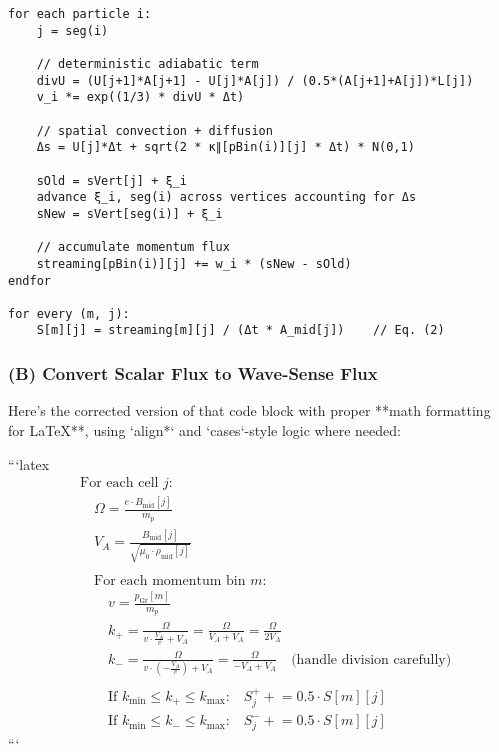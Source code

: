 \begin{lstlisting}
for each particle i:
    j = seg(i)

    // deterministic adiabatic term
    divU = (U[j+1]*A[j+1] - U[j]*A[j]) / (0.5*(A[j+1]+A[j])*L[j])
    v_i *= exp((1/3) * divU * Δt)

    // spatial convection + diffusion
    Δs = U[j]*Δt + sqrt(2 * κ∥[pBin(i)][j] * Δt) * N(0,1)

    sOld = sVert[j] + ξ_i
    advance ξ_i, seg(i) across vertices accounting for Δs
    sNew = sVert[seg(i)] + ξ_i

    // accumulate momentum flux
    streaming[pBin(i)][j] += w_i * (sNew - sOld)
endfor

for every (m, j):
    S[m][j] = streaming[m][j] / (Δt * A_mid[j])    // Eq. (2)
\end{lstlisting}

\subsubsection*{(B) Convert Scalar Flux to Wave-Sense Flux}

Here's the corrected version of that code block with proper **math formatting for LaTeX**, using `align*` and `cases`-style logic where needed:

```latex
\[
\begin{aligned}
&\text{For each cell } j: \\
&\quad \Omega = \frac{e \cdot B_{\text{mid}}[j]}{m_p} \\
&\quad V_A = \frac{B_{\text{mid}}[j]}{\sqrt{\mu_0 \cdot \rho_{\text{mid}}[j]}} \\
\\
&\quad \text{For each momentum bin } m: \\
&\quad \quad v = \frac{p_{\text{Gr}}[m]}{m_p} \\
&\quad \quad k_+ = \frac{\Omega}{v \cdot \frac{V_A}{v} + V_A} = \frac{\Omega}{V_A + V_A} = \frac{\Omega}{2V_A} \\
&\quad \quad k_- = \frac{\Omega}{v \cdot \left(-\frac{V_A}{v}\right) + V_A} = \frac{\Omega}{-V_A + V_A} \quad \text{(handle division carefully)} \\
\\
&\quad \quad \text{If } k_{\min} \leq k_+ \leq k_{\max} \text{:} \quad S^+_j \mathrel{+}= 0.5 \cdot S[m][j] \\
&\quad \quad \text{If } k_{\min} \leq k_- \leq k_{\max} \text{:} \quad S^-_j \mathrel{+}= 0.5 \cdot S[m][j]
\end{aligned}
\]
```


